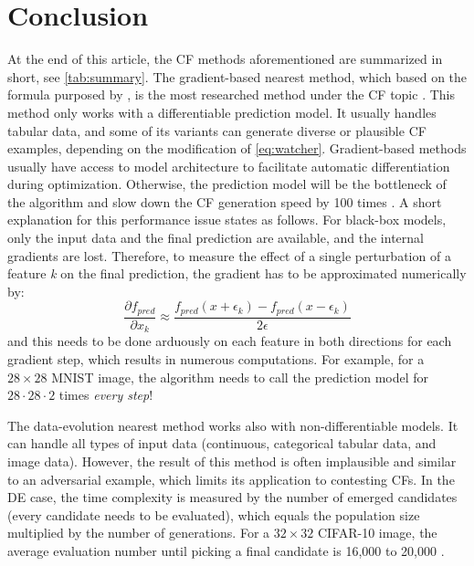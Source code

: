 \section{Conclusion}\label{sec:Conclude}
At the end of this article, the CF methods aforementioned are summarized in short, see \autoref{tab:summary}. The gradient-based nearest method, which based on the formula purposed by \citeauthor{watcher2017} \cite{watcher2017}, is the most researched method under the CF topic \cite{CFReview}. This method only works with a differentiable prediction model. It usually handles tabular data, and some of its variants can generate diverse \cite{DiCE,russellDiverse} or plausible \cite{prototype} CF examples, depending on the modification of \autoref{eq:watcher}. Gradient-based methods usually have access to model architecture to facilitate automatic differentiation during optimization. Otherwise, the prediction model will be the bottleneck of the algorithm and slow down the CF generation speed by 100 times \cite{prototype}. A short explanation for this performance issue states as follows. For black-box models, only the input data and the final prediction are available, and the internal gradients are lost. Therefore, to measure the effect of a single perturbation of a feature \emph{k} on the final prediction, the gradient has to be approximated numerically by:
\begin{equation}\label{eq:gradientNumerical}
  \frac{\partial f_{pred}}{\partial x_k}\approx\frac{f_{pred}(x+\epsilon_k)-f_{pred}(x-\epsilon_k)}{2\epsilon}
\end{equation}
and this needs to be done arduously on each feature in both directions for each gradient step, which results in numerous computations. For example, for a $28\times28$ MNIST image, the algorithm needs to call the prediction model for $28\cdot28\cdot2$ times \emph{every step}!

The data-evolution nearest method works also with non-differentiable models. It can handle all types of input data (continuous, categorical tabular data, and image data). However, the result of this method is often implausible and similar to an adversarial example, which limits its application to contesting CFs. In the DE case, the time complexity is measured by the number of emerged candidates (every candidate needs to be evaluated), which equals the population size multiplied by the number of generations. For a $32\times32$ CIFAR-10 image, the average evaluation number until picking a final candidate is 16,000 to 20,000 \cite{onePixel}.

